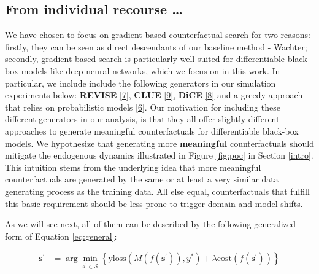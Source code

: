 \documentclass[conference,final,]{IEEEtran}
\theoremstyle{definition}
\theoremstyle{definition}
\theoremstyle{definition}
\theoremstyle{definition}
\theoremstyle{remark}
\begin{document}
\hypertarget{method-general}{%
\subsection{From individual recourse \ldots{}}\label{method-general}}

We have chosen to focus on gradient-based counterfactual search for two reasons: firstly, they can be seen as direct descendants of our baseline method - Wachter; secondly, gradient-based search is particularly well-suited for differentiable black-box models like deep neural networks, which we focus on in this work. In particular, we include include the following generators in our simulation experiments below: \textbf{REVISE} \protect\hyperlink{ref-joshi2019towards}{{[}7{]}}, \textbf{CLUE} \protect\hyperlink{ref-antoran2020getting}{{[}9{]}}, \textbf{DiCE} \protect\hyperlink{ref-mothilal2020explaining}{{[}8{]}} and a greedy approach that relies on probabilistic models \protect\hyperlink{ref-schut2021generating}{{[}6{]}}. Our motivation for including these different generators in our analysis, is that they all offer slightly different approaches to generate meaningful counterfactuals for differentiable black-box models. We hypothesize that generating more \textbf{meaningful} counterfactuals should mitigate the endogenous dynamics illustrated in Figure \ref{fig:poc} in Section \ref{intro}. This intuition stems from the underlying idea that more meaningful counterfactuals are generated by the same or at least a very similar data generating process as the training data. All else equal, counterfactuals that fulfill this basic requirement should be less prone to trigger domain and model shifts.

As we will see next, all of them can be described by the following generalized form of Equation \eqref{eq:general}:

\begin{equation}
\begin{aligned}
\mathbf{s}^\prime &= \arg \min_{\mathbf{s}^\prime \in \mathcal{S}} \left\{  {\text{yloss}(M(f(\mathbf{s}^\prime)),y^*)}+ \lambda {\text{cost}(f(\mathbf{s}^\prime)) }  \right\} \label{eq:general}
\end{aligned} 
\end{equation}
\end{document}
